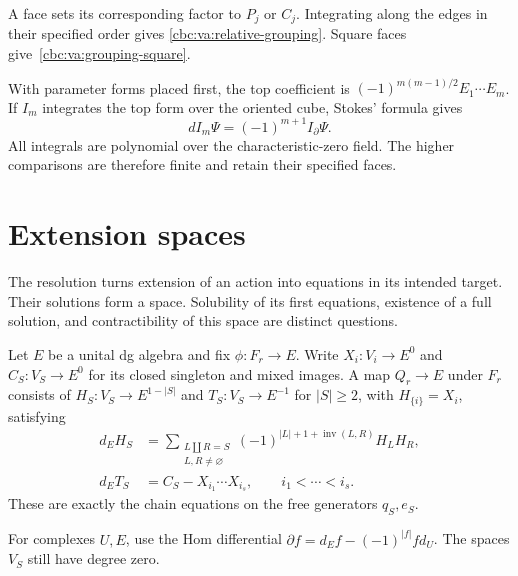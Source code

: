 A face sets its corresponding factor to $P_j$
or $C_j$. Integrating along the edges in their
specified order gives
\eqref{cbc:va:relative-grouping}. Square faces
give~\eqref{cbc:va:grouping-square}.

With parameter forms placed first, the top
coefficient is
$(-1)^{m(m-1)/2}E_1\cdots E_m$.
If $I_m$ integrates the top form over the
oriented cube, Stokes' formula gives
\[
 d I_m\Psi=(-1)^{m+1}I_{\partial}\Psi.
\]
All integrals are polynomial over the
characteristic-zero field. The higher comparisons
are therefore finite and retain their specified
faces.

\section{Extension spaces}
\label{cbc:va:extensions}

The resolution turns extension of an action into
equations in its intended target. Their solutions
form a space. Solubility of its first equations,
existence of a full solution, and contractibility
of this space are distinct questions.

Let $E$ be a unital dg algebra and fix
$\phi:F_r\to E$. Write $X_i:V_i\to E^0$ and
$C_S:V_S\to E^0$ for its closed singleton and mixed
images. A map $Q_r\to E$ under $F_r$ consists of
$H_S:V_S\to E^{1-|S|}$ and $T_S:V_S\to E^{-1}$
for $|S|\geq2$, with $H_{\{i\}}=X_i$, satisfying
\begin{align}
 d_EH_S&=
 \sum_{\substack{L\amalg R=S\\L,R\ne\varnothing}}
 (-1)^{|L|+1+\operatorname{inv}(L,R)}H_LH_R,
 \label{cbc:va:extension-h}\\
 d_ET_S&=C_S-X_{i_1}\cdots X_{i_s},
                    \qquad i_1<\cdots<i_s.
 \label{cbc:va:extension-t}
\end{align}
These are exactly the chain equations on the
free generators $q_S,e_S$.

For complexes $U,E$, use the Hom differential
$\partial f=d_Ef-(-1)^{|f|}fd_U$.
The spaces $V_S$ still have degree zero.

